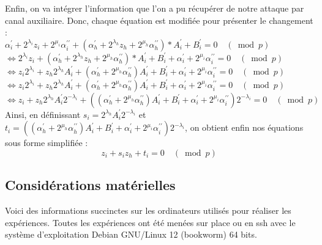 \documentclass{backend}
\begin{document}
Enfin, on va intégrer l'information que l'on a pu récupérer de notre attaque par canal auxiliaire. Donc, chaque équation est modifiée pour présenter le changement :\\
$ \alpha_{i}^{\prime}+2^{\lambda_{i}} z_{i}+2^{\mu_{i}} \alpha_{i}^{\prime \prime} + (\alpha_{h}^{\prime}+2^{\lambda_{h}} z_{h}+2^{\mu_{h}} \alpha_{h}^{\prime \prime}) * A^{\prime}_{i} + B^{\prime}_{i} = 0 \quad(\bmod p)$\\
$ \Leftrightarrow 2^{\lambda_{i}} z_{i} + (\alpha_{h}^{\prime}+2^{\lambda_{h}} z_{h}+2^{\mu_{h}} \alpha_{h}^{\prime \prime}) * A^{\prime}_{i} + B^{\prime}_{i}+\alpha_{i}^{\prime}+2^{\mu_{i}} \alpha_{i}^{\prime \prime} = 0 \quad(\bmod p)$ \\
$ \Leftrightarrow z_{i}2^{\lambda_{i}}  +z_{h}2^{\lambda_{h}} A^{\prime}_{i} + (\alpha_{h}^{\prime}+2^{\mu_{h}} \alpha_{h}^{\prime \prime})A^{\prime}_{i} + B^{\prime}_{i}+\alpha_{i}^{\prime}+2^{\mu_{i}} \alpha_{i}^{\prime \prime} = 0 \quad(\bmod p)$\\
$ \Leftrightarrow z_{i}2^{\lambda_{i}}  +z_{h}2^{\lambda_{h}} A^{\prime}_{i} +(\alpha_{h}^{\prime}+2^{\mu_{h}} \alpha_{h}^{\prime \prime})A^{\prime}_{i} + B^{\prime}_{i}+\alpha_{i}^{\prime}+2^{\mu_{i}} \alpha_{i}^{\prime \prime} = 0 \quad(\bmod p)$\\
$ \Leftrightarrow z_{i}  +z_{h}2^{\lambda_{h}} A^{\prime}_{i}2^{-\lambda_{i}} +((\alpha_{h}^{\prime}+2^{\mu_{h}} \alpha_{h}^{\prime \prime})A^{\prime}_{i} + B^{\prime}_{i}+\alpha_{i}^{\prime}+2^{\mu_{i}} \alpha_{i}^{\prime \prime}) 2^{-\lambda_{i}}= 0 \quad(\bmod p)$\\

Ainsi, en définissant $s_{i} = 2^{\lambda_{h}} A^{\prime}_{i}2^{-\lambda_{i}}$ et $ t_{i} =  ((\alpha_{h}^{\prime}+2^{\mu_{h}} \alpha_{h}^{\prime \prime})A^{\prime}_{i} + B^{\prime}_{i}+\alpha_{i}^{\prime}+2^{\mu_{i}} \alpha_{i}^{\prime \prime}) 2^{-\lambda_{i}}$, on obtient enfin nos équations sous forme simplifiée  :
$$  z_{i}+s_{i} z_{h}+t_{i} = 0 \quad(\bmod p)$$

\newpage

\subsection{Considérations matérielles} \label{annexe:machines}

Voici des informations succinctes sur les ordinateurs utilisés pour réaliser les expériences.
Toutes les expériences ont été menées sur place ou en ssh avec le système d'exploitation Debian GNU/Linux 12 (bookworm) 64 bits.
\end{document}
